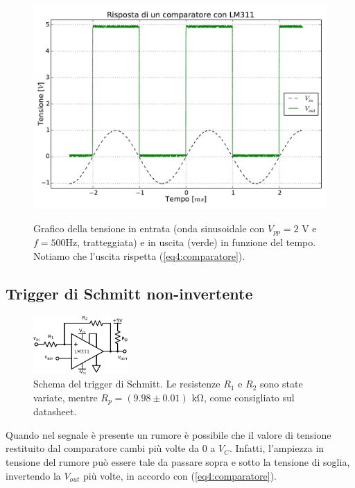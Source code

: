 \begin{figure}[ht]
 \centering
   {\includegraphics[width=14.5cm]{../E04/latex/comp.pdf}}
 \caption{Grafico della tensione in entrata (onda sinusoidale con $V_{pp}=2$ \si{\volt} e $f=500$\si{\hertz}, tratteggiata) e in uscita (verde) in funzione del tempo. Notiamo che l'uscita rispetta (\ref{eq4:comparatore}).}
 \label{gr4:comparatore}
\end{figure}

\subsection{Trigger di Schmitt non-invertente}

\begin{figure}
  \begin{center}
    \includegraphics[width=0.320\textwidth]{../E04/latex/c_schmitt.pdf}
  \end{center}
  \caption{Schema del trigger di Schmitt. Le resistenze $R_1$ e $R_2$ sono state variate, mentre $R_p=(9.98 \pm 0.01)$ \si{\kilo\ohm}, come consigliato sul datasheet.}
  \label{cir4:schmitt}
\end{figure}

Quando nel segnale è presente un rumore è possibile che il valore di tensione restituito dal comparatore cambi più volte da $0$ a $V_{C}$.
Infatti, l'ampiezza in tensione del rumore può essere tale da passare sopra e sotto la tensione di soglia, invertendo la $V_{out}$ più volte, in accordo con (\ref{eq4:comparatore}).


